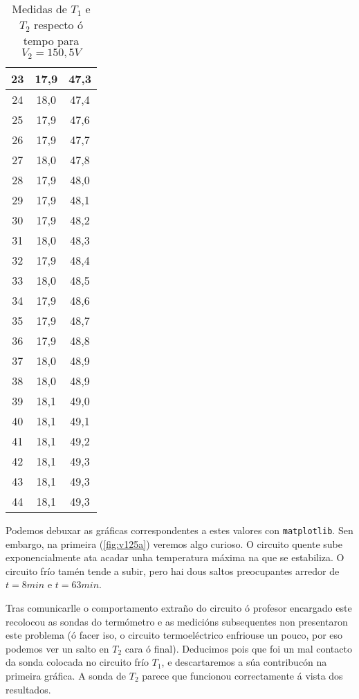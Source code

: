 \documentclass[12pt, a4paper, titlepage]{article}
\begin{document}
\begin{table}[H]
\begin{minipage}[c]{0,4\textwidth}
\begin{table}[H]
\begin{tabular}{|c|c|c|}
        23 & 17,9 & 47,3 \\ \hline
        24 & 18,0 & 47,4 \\ \hline
        25 & 17,9 & 47,6 \\ \hline
        26 & 17,9 & 47,7 \\ \hline
        27 & 18,0 & 47,8 \\ \hline
        28 & 17,9 & 48,0 \\ \hline
        29 & 17,9 & 48,1 \\ \hline
        30 & 17,9 & 48,2 \\ \hline
        31 & 18,0 & 48,3 \\ \hline
        32 & 17,9 & 48,4 \\ \hline
        33 & 18,0 & 48,5 \\ \hline
        34 & 17,9 & 48,6 \\ \hline
        35 & 17,9 & 48,7 \\ \hline
        36 & 17,9 & 48,8 \\ \hline
        37 & 18,0 & 48,9 \\ \hline
        38 & 18,0 & 48,9 \\ \hline
        39 & 18,1 & 49,0 \\ \hline
        40 & 18,1 & 49,1 \\ \hline
        41 & 18,1 & 49,2 \\ \hline
        42 & 18,1 & 49,3 \\ \hline
        43 & 18,1 & 49,3 \\ \hline
        44 & 18,1 & 49,3 \\ \hline
        \end{tabular}
      \end{table}
    \end{minipage}
    \caption{Medidas de $T_1$ e $T_2$ respecto ó tempo para $V_2 = 150,5V$}
  \end{table}
  
  Podemos debuxar as gráficas correspondentes a estes valores con \texttt{matplotlib}. Sen embargo, na primeira (\ref{fig:v125a}) veremos algo curioso.
  O circuito quente sube exponencialmente ata acadar unha temperatura máxima na que se estabiliza.
  O circuito frío tamén tende a subir, pero hai dous saltos preocupantes arredor de $t = 8 min$ e $t = 63 min$.

  Tras comunicarlle o comportamento extraño do circuito ó profesor encargado este recolocou as sondas do termómetro e as medicións subsequentes non presentaron este problema (ó facer iso, o circuito termoeléctrico enfriouse un pouco, por eso podemos ver un salto en $T_2$ cara ó final).
  Deducimos pois que foi un mal contacto da sonda colocada no circuito frío $T_1$, e descartaremos a súa contribucón na primeira gráfica. A sonda de $T_2$ parece que funcionou correctamente á vista dos resultados.
\end{document}
